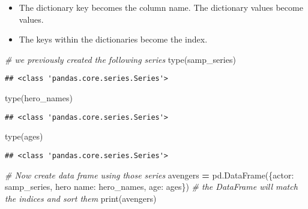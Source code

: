 \documentclass[
]{book}
\newenvironment{Shaded}{\begin{snugshade}}{\end{snugshade}}
\newcommand{\BuiltInTok}[1]{#1}
\newcommand{\CommentTok}[1]{\textcolor[rgb]{0.56,0.35,0.01}{\textit{#1}}}
\newcommand{\NormalTok}[1]{#1}
\newcommand{\OperatorTok}[1]{\textcolor[rgb]{0.81,0.36,0.00}{\textbf{#1}}}
\newcommand{\StringTok}[1]{\textcolor[rgb]{0.31,0.60,0.02}{#1}}
\begin{document}
\begin{itemize}
\item
  The dictionary key becomes the column name. The dictionary values become values.
\item
  The keys within the dictionaries become the index.
\end{itemize}

\begin{Shaded}
\begin{Highlighting}[]
\CommentTok{\# we previously created the following series}
\BuiltInTok{type}\NormalTok{(samp\_series)}
\end{Highlighting}
\end{Shaded}

\begin{verbatim}
## <class 'pandas.core.series.Series'>
\end{verbatim}

\begin{Shaded}
\begin{Highlighting}[]
\BuiltInTok{type}\NormalTok{(hero\_names)}
\end{Highlighting}
\end{Shaded}

\begin{verbatim}
## <class 'pandas.core.series.Series'>
\end{verbatim}

\begin{Shaded}
\begin{Highlighting}[]
\BuiltInTok{type}\NormalTok{(ages)}
\end{Highlighting}
\end{Shaded}

\begin{verbatim}
## <class 'pandas.core.series.Series'>
\end{verbatim}

\begin{Shaded}
\begin{Highlighting}[]
\CommentTok{\# Now create data frame using those series}
\NormalTok{avengers }\OperatorTok{=}\NormalTok{ pd.DataFrame(\{}\StringTok{\textquotesingle{}actor\textquotesingle{}}\NormalTok{: samp\_series, }\StringTok{\textquotesingle{}hero name\textquotesingle{}}\NormalTok{: hero\_names, }\StringTok{\textquotesingle{}age\textquotesingle{}}\NormalTok{: ages\})}
\CommentTok{\# the DataFrame will match the indices and sort them}
\BuiltInTok{print}\NormalTok{(avengers)}
\end{Highlighting}
\end{Shaded}
\end{document}
